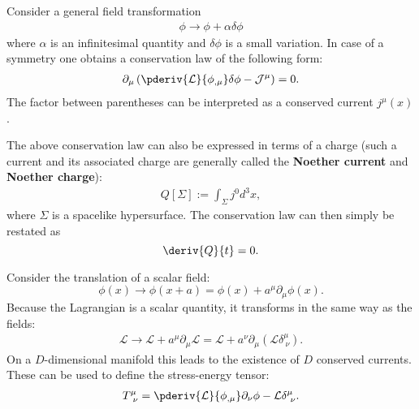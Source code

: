     \begin{theorem}\label{qft:noethers_theorem}
        Consider a general field transformation
        \begin{gather}
            \label{qft:noether}
            \phi\rightarrow\phi+\alpha\delta\phi
        \end{gather}
        where $\alpha$ is an infinitesimal quantity and $\delta\phi$ is a small variation. In case of a symmetry one obtains a conservation law of the following form:
        \begin{gather}
            \label{qft:conserved_current}
            \partial_\mu\left(\pderiv{\mathcal{L}}{\phi_{,\mu}}\delta\phi - \mathcal{J}^\mu\right) = 0.
        \end{gather}
        The factor between parentheses can be interpreted as a conserved current $j^\mu(x)$.
    \end{theorem}
    The above conservation law can also be expressed in terms of a charge (such a current and its associated charge are generally called the \textbf{Noether current} and \textbf{Noether charge}):
    \begin{gather}
        Q[\Sigma] := \int_\Sigma j^0d^3x,
    \end{gather}
    where $\Sigma$ is a spacelike hypersurface. The conservation law can then simply be restated as \[\deriv{Q}{t} = 0.\]

    \begin{definition}
        Consider the translation of a scalar field: \[\phi(x)\rightarrow\phi(x+a) = \phi(x) + a^\mu\partial_\mu\phi(x).\] Because the Lagrangian is a scalar quantity, it transforms in the same way as the fields:
        \begin{gather}
            \mathcal{L}\rightarrow\mathcal{L} + a^\mu\partial_\mu\mathcal{L} = \mathcal{L} + a^\nu\partial_\mu(\mathcal{L}\delta^\mu_{\ \nu}).
        \end{gather}
        On a $D$-dimensional manifold this leads to the existence of $D$ conserved currents. These can be used to define the stress-energy tensor:
        \begin{gather}
            \label{relativity:stress_energy_tensor}
            T^\mu_{\ \nu} = \pderiv{\mathcal{L}}{\phi_{,\mu}}\partial_\nu\phi - \mathcal{L}\delta^\mu_{\ \nu}.
        \end{gather}
    \end{definition}

